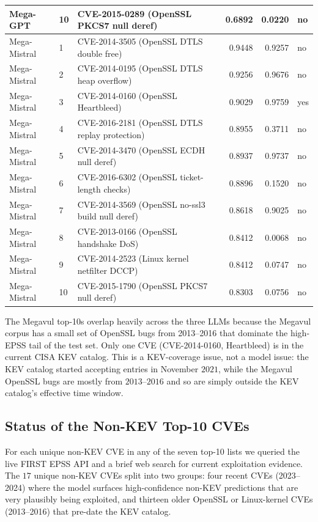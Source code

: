 \documentclass[11pt]{article}
\begin{document}
\begin{longtable}{llp{}rrl}
Mega-GPT     & 10 & CVE-2015-0289 (OpenSSL PKCS7 null deref)            & 0.6892 & 0.0220 & no \\
\midrule
Mega-Mistral &  1 & CVE-2014-3505 (OpenSSL DTLS double free)            & 0.9448 & 0.9257 & no \\
Mega-Mistral &  2 & CVE-2014-0195 (OpenSSL DTLS heap overflow)          & 0.9256 & 0.9676 & no \\
Mega-Mistral &  3 & CVE-2014-0160 (OpenSSL Heartbleed)                  & 0.9029 & 0.9759 & yes \\
Mega-Mistral &  4 & CVE-2016-2181 (OpenSSL DTLS replay protection)      & 0.8955 & 0.3711 & no \\
Mega-Mistral &  5 & CVE-2014-3470 (OpenSSL ECDH null deref)             & 0.8937 & 0.9737 & no \\
Mega-Mistral &  6 & CVE-2016-6302 (OpenSSL ticket-length checks)        & 0.8896 & 0.1520 & no \\
Mega-Mistral &  7 & CVE-2014-3569 (OpenSSL no-ssl3 build null deref)    & 0.8618 & 0.9025 & no \\
Mega-Mistral &  8 & CVE-2013-0166 (OpenSSL handshake DoS)               & 0.8412 & 0.0068 & no \\
Mega-Mistral &  9 & CVE-2014-2523 (Linux kernel netfilter DCCP)         & 0.8412 & 0.0747 & no \\
Mega-Mistral & 10 & CVE-2015-1790 (OpenSSL PKCS7 null deref)            & 0.8303 & 0.0756 & no \\

\end{longtable}
\normalsize

The Megavul top-10s overlap heavily across the three LLMs because the
Megavul corpus has a small set of OpenSSL bugs from 2013--2016 that
dominate the high-EPSS tail of the test set. Only one CVE
(CVE-2014-0160, Heartbleed) is in the current CISA KEV catalog. This
is a KEV-coverage issue, not a model issue: the KEV catalog started
accepting entries in November $2021$, while the Megavul OpenSSL bugs
are mostly from $2013$--$2016$ and so are simply outside the KEV
catalog's effective time window.

\subsection{Status of the Non-KEV Top-10 CVEs}
\label{tab:non-kev-status}

For each unique non-KEV CVE in any of the seven top-10 lists we
queried the live FIRST EPSS API and a brief web search for current
exploitation evidence. The $17$ unique non-KEV CVEs split into two
groups: four recent CVEs (2023--2024) where the model surfaces
high-confidence non-KEV predictions that are very plausibly being
exploited, and thirteen older OpenSSL or Linux-kernel CVEs
(2013--2016) that pre-date the KEV catalog.
\end{document}
